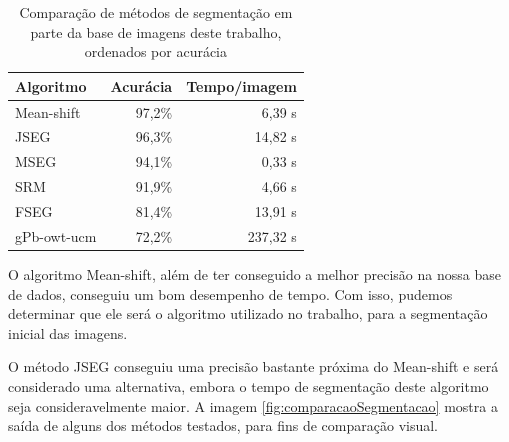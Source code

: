 \begin{table}[h]
\ABNTEXfontereduzida
\centering
\begin{tabulary}{\linewidth}{|L|R|R|}
\hline
\textbf{Algoritmo} & \textbf{Acurácia} & \textbf{Tempo/imagem} \\ \hline
Mean-shift  & 97,2\% & 6,39 s \\ \hline
JSEG        & 96,3\% & 14,82 s \\ \hline
MSEG        & 94,1\% & 0,33 s \\ \hline
SRM         & 91,9\% & 4,66 s \\ \hline
FSEG        & 81,4\% & 13,91 s \\ \hline
gPb-owt-ucm & 72,2\% & 237,32 s \\ \hline
\end{tabulary}
\caption{Comparação de métodos de segmentação em parte da base de imagens deste trabalho, ordenados por acurácia}
\label{tab:experimentoSegmentacao}
\end{table}

O algoritmo Mean-shift, além de ter conseguido a melhor precisão na nossa base de dados, conseguiu um bom desempenho de tempo. Com isso, pudemos determinar que ele será o algoritmo utilizado no trabalho, para a segmentação inicial das imagens.

O método JSEG conseguiu uma precisão bastante próxima do Mean-shift e será considerado uma alternativa, embora o tempo de segmentação deste algoritmo seja consideravelmente maior. A imagem \ref{fig:comparacaoSegmentacao} mostra a saída de alguns dos métodos testados, para fins de comparação visual.

